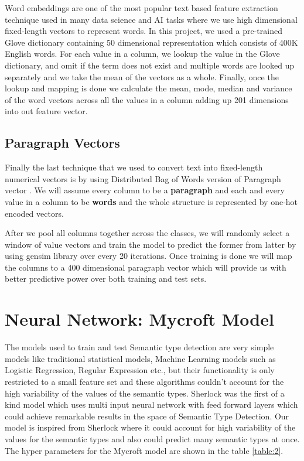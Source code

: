 \documentclass[12pt, a4paper]{report}
\theoremstyle{definition}
\numberwithin{equation}{chapter}
\numberwithin{figure}{chapter}
\numberwithin{table}{chapter}
\begin{document}
\begin{spacing}{1.5}
Word embeddings are one of the most popular text based feature extraction technique used in many data science and AI tasks where we use high dimensional fixed-length vectors to represent words. In this project, we used a pre-trained Glove dictionary \cite{glove} containing 50 dimensional representation which consists of 400K English words. For each value in a column, we lookup the value in the Glove dictionary, and omit if the term does not exist and multiple words are looked up separately and we take the mean of the vectors as a whole. Finally, once the lookup and mapping is done we calculate the mean, mode, median and variance of the word vectors across all the values in a column adding up 201 dimensions into out feature vector.

\subsection{Paragraph Vectors}
\label{ssec:para}

Finally the last technique that we used to convert text into fixed-length numerical vectors is by using Distributed Bag of Words version of Paragraph vector \cite{para}. We will assume every column to be a \textbf{paragraph} and each and every value in a column to be \textbf{words} and the whole structure is represented by one-hot encoded vectors.
\par
\setlength{\parskip}{2.2em}
\setlength{\parindent}{0em}
After we pool all columns together across the classes, we will randomly select a window of value vectors and train the model to predict the former from latter by using gensim library \cite{gensim} over every 20 iterations. Once training is done we will map the columns to a 400 dimensional paragraph vector which will provide us with better predictive power over both training and test sets.


\section{Neural Network: Mycroft Model}
\label{sec:nn}

The models used to train and test Semantic type detection are very simple models like traditional statistical models, Machine Learning models such as Logistic Regression, Regular Expression etc., but their functionality is only restricted to a small feature set and these algorithms couldn't account for the high variability of the values of the semantic types. Sherlock was the first of a kind model which uses multi input neural network with feed forward layers which could achieve remarkable results in the space of Semantic Type Detection. Our model is inspired from Sherlock where it could account for high variability of the values for the semantic types and also could predict many semantic types at once. The hyper parameters for the Mycroft model are shown in the table \ref{table:2}.


\end{spacing}
\end{document}
